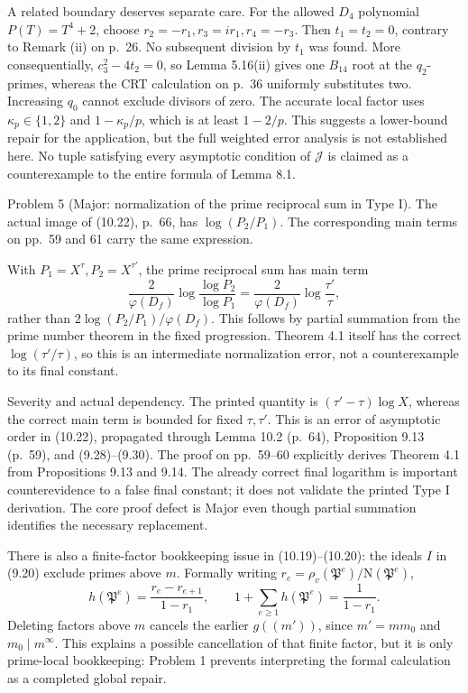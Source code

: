 \documentclass[10pt]{article}
\begin{document}
A related boundary deserves separate care. For the allowed \(D_4\) polynomial \(P(T)=T^4+2\), choose \(r_2=-r_1,r_3=ir_1,r_4=-r_3\). Then \(t_1=t_2=0\), contrary to Remark (ii) on p. 26. No subsequent division by \(t_1\) was found. More consequentially, \(c_3^2-4t_2=0\), so Lemma 5.16(ii) gives one \(B_{14}\) root at the \(q_2\)-primes, whereas the CRT calculation on p. 36 uniformly substitutes two. Increasing \(q_0\) cannot exclude divisors of zero. The accurate local factor uses \(\kappa_p\in\{1,2\}\) and \(1-\kappa_p/p\), which is at least \(1-2/p\). This suggests a lower-bound repair for the application, but the full weighted error analysis is not established here. No tuple satisfying every asymptotic condition of \(\mathcal J\) is claimed as a counterexample to the entire formula of Lemma 8.1.\par
Problem 5 (Major: normalization of the prime reciprocal sum in Type I).  The actual image of (10.22), p. 66, has \(\log(P_2/P_1)\). The corresponding main terms on pp. 59 and 61 carry the same expression.\par
With \(P_1=X^\tau,P_2=X^{\tau'}\), the prime reciprocal sum has main term \[\frac2{\varphi(D_f)}
 \log\frac{\log P_2}{\log P_1}
 =\frac2{\varphi(D_f)}\log\frac{\tau'}{\tau},\] rather than \(2\log(P_2/P_1)/\varphi(D_f)\). This follows by partial summation from the prime number theorem in the fixed progression. Theorem 4.1 itself has the correct \(\log(\tau'/\tau)\), so this is an intermediate normalization error, not a counterexample to its final constant.\par
Severity and actual dependency. The printed quantity is \((\tau'-\tau)\log X\), whereas the correct main term is bounded for fixed \(\tau,\tau'\). This is an error of asymptotic order in (10.22), propagated through Lemma 10.2 (p. 64), Proposition 9.13 (p. 59), and (9.28)–(9.30). The proof on pp. 59–60 explicitly derives Theorem 4.1 from Propositions 9.13 and 9.14. The already correct final logarithm is important counterevidence to a false final constant; it does not validate the printed Type I derivation. The core proof defect is Major even though partial summation identifies the necessary replacement.\par
There is also a finite-factor bookkeeping issue in (10.19)–(10.20): the ideals \(I\) in (9.20) exclude primes above \(m\). Formally writing \(r_e=\rho_v(\mathfrak P^e)/\mathrm N(\mathfrak P^e)\), \[h(\mathfrak P^e)=\frac{r_e-r_{e+1}}{1-r_1},\qquad
 1+\sum_{e\ge1}h(\mathfrak P^e)=\frac1{1-r_1}.\] Deleting factors above \(m\) cancels the earlier \(g((m'))\), since \(m'=mm_0\) and \(m_0\mid m^\infty\). This explains a possible cancellation of that finite factor, but it is only prime-local bookkeeping: Problem 1 prevents interpreting the formal calculation as a completed global repair.\par
\end{document}
